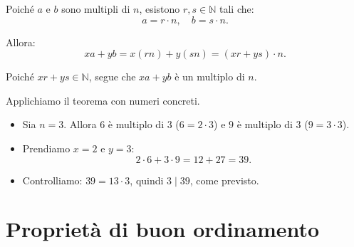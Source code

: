 \begin{thmpf}
Poiché \(a\) e \(b\) sono multipli di \(n\), esistono \(r, s \in \mathbb{N}\) tali che:
\[
a = r \cdot n, \quad b = s \cdot n.
\]

Allora:
\[
xa + yb = x(rn) + y(sn) = (xr + ys)\cdot n.
\]

Poiché \(xr + ys \in \mathbb{N}\), segue che \(xa + yb\) è un multiplo di \(n\).
\end{thmpf}

\begin{esempio}
Applichiamo il teorema con numeri concreti.


\begin{itemize}
    \item Sia \(n=3\). Allora \(6\) è multiplo di \(3\) (\(6=2\cdot 3\)) e \(9\) è multiplo di \(3\) (\(9=3\cdot 3\)).
    \item Prendiamo \(x=2\) e \(y=3\):
    \[
    2\cdot 6 + 3\cdot 9 = 12 + 27 = 39.
    \]
    \item Controlliamo: \(39 = 13\cdot 3\), quindi \(3 \mid 39\), come previsto.
\end{itemize}
\end{esempio}

\section{Proprietà di buon ordinamento}



